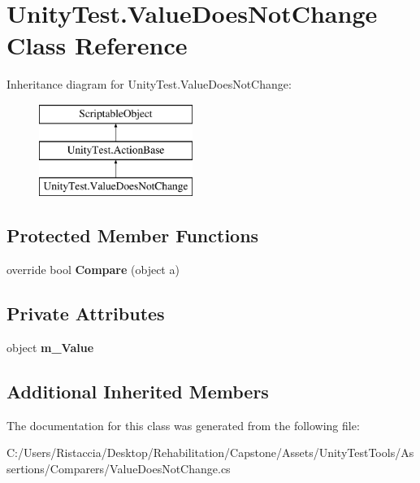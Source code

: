 \hypertarget{class_unity_test_1_1_value_does_not_change}{}\section{Unity\+Test.\+Value\+Does\+Not\+Change Class Reference}
\label{class_unity_test_1_1_value_does_not_change}
Inheritance diagram for Unity\+Test.\+Value\+Does\+Not\+Change\+:\begin{figure}[H]
\begin{center}
\leavevmode
\includegraphics[height=3.000000cm]{class_unity_test_1_1_value_does_not_change}
\end{center}
\end{figure}
\subsection*{Protected Member Functions}
\begin{DoxyCompactItemize}
\item 
\mbox{\label{class_unity_test_1_1_value_does_not_change_a77fa1342ea52a5c40adca5df4cdb38cb}} 
override bool {\bfseries Compare} (object a)
\end{DoxyCompactItemize}
\subsection*{Private Attributes}
\begin{DoxyCompactItemize}
\item 
\mbox{\label{class_unity_test_1_1_value_does_not_change_a49bd14e756a34f9d1cef8f801f2fed08}} 
object {\bfseries m\+\_\+\+Value}
\end{DoxyCompactItemize}
\subsection*{Additional Inherited Members}


The documentation for this class was generated from the following file\+:\begin{DoxyCompactItemize}
\item 
C\+:/\+Users/\+Ristaccia/\+Desktop/\+Rehabilitation/\+Capstone/\+Assets/\+Unity\+Test\+Tools/\+Assertions/\+Comparers/Value\+Does\+Not\+Change.\+cs\end{DoxyCompactItemize}
